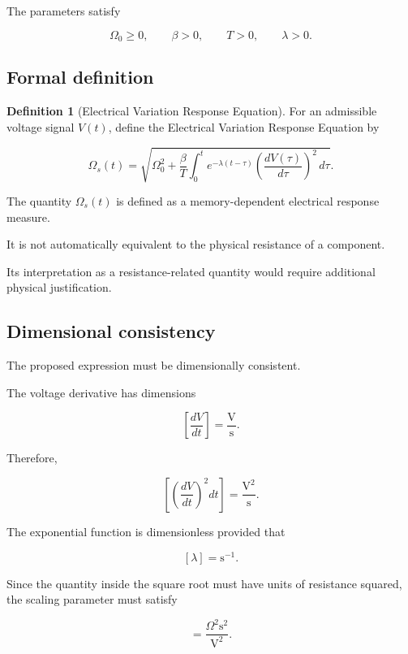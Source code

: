 \documentclass[12pt]{article}
\theoremstyle{definition}
\newtheorem{definition}[theorem]{Definition}
\theoremstyle{remark}
\begin{document}
The parameters satisfy

\[
\Omega_0\geq0,\qquad
\beta>0,\qquad
T>0,\qquad
\lambda>0.
\]

\subsection{Formal definition}

\begin{definition}[Electrical Variation Response Equation]

For an admissible voltage signal \(V(t)\),
define the Electrical Variation Response Equation
by

\begin{equation}
\Omega_s(t)=
\sqrt{
\Omega_0^2+
\frac{\beta}{T}
\int_0^t
e^{-\lambda(t-\tau)}
\left(\frac{dV(\tau)}{d\tau}\right)^2
\,d\tau
}.
\label{eq:evre}
\end{equation}

\end{definition}

The quantity \(\Omega_s(t)\) is defined as a
memory-dependent electrical response measure.

It is not automatically equivalent to the
physical resistance of a component.

Its interpretation as a resistance-related
quantity would require additional physical
justification.

\subsection{Dimensional consistency}

The proposed expression must be dimensionally
consistent.

The voltage derivative has dimensions

\[
\left[\frac{dV}{dt}\right]
=
\frac{\mathrm{V}}{\mathrm{s}}.
\]

Therefore,

\[
\left[
\left(\frac{dV}{dt}\right)^2dt
\right]
=
\frac{\mathrm{V}^2}{\mathrm{s}}.
\]

The exponential function is dimensionless
provided that

\[
[\lambda]=\mathrm{s}^{-1}.
\]

Since the quantity inside the square root
must have units of resistance squared,
the scaling parameter must satisfy

\begin{equation}
[\beta]
=
\frac{\Omega^2\mathrm{s}^2}{\mathrm{V}^2}.
\label{eq:beta-units}
\end{equation}
\end{document}
